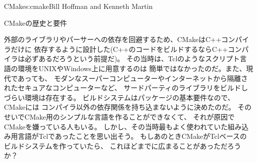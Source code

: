 \begin{aosachapter}{CMake}{s:cmake}{Bill Hoffman and Kenneth Martin}
\begin{aosasect1}{CMakeの歴史と要件}
\begin{aosaitemize}
\end{aosaitemize}

外部のライブラリやパーサーへの依存を回避するため、CMakeはC++コンパイラだけに
依存するように設計した(C++のコードをビルドするならC++コンパイラは必ずあるだろうという前提だ)。
その当時は、Tclのようなスクリプト言語の環境をUNIXやWindows上に用意するのは
簡単ではなかったのだ。また、現代であっても、
モダンなスーパーコンピューターやインターネットから隔離されたセキュアなコンピューターなど、
サードパーティのライブラリをビルドしづらい環境は存在する。
ビルドシステムはパッケージの基本要件なので、CMakeには
コンパイラ以外の依存関係を持ち込まないように決めたのだ。
そのせいでCMake用のシンプルな言語を作ることができなくて、
それが原因でCMakeを嫌っている人もいる。
しかし、その当時最もよく使われていた組み込み用言語がTclであったことを思い出そう。
もしあのときCMakeがTclベースのビルドシステムを作っていたら、
これほどまでに広まることがあっただろうか？


\end{aosasect1}
\end{aosachapter}
